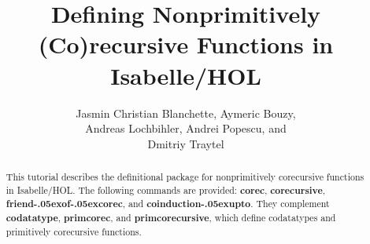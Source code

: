 \documentclass[12pt,a4paper]{article} %
\title{%
Defining Nonprimitively (Co)recursive Functions in Isabelle/HOL}
\author{Jasmin Christian Blanchette, Aymeric Bouzy, \\
Andreas Lochbihler, Andrei Popescu, and \\
Dmitriy Traytel}
\renewcommand\_{\hbox{\textunderscore\kern-.05ex}}
\newcommand{\keyw}[1]{\textbf{#1}}
\begin{document}
\maketitle

\begin{sloppy}
\begin{abstract}
\noindent
This tutorial describes the definitional package for nonprimitively corecursive functions
in Isabelle/HOL. The following commands are provided:
\keyw{corec}, \keyw{corecursive}, \keyw{friend\_of\_corec}, and \keyw{coinduction\_upto}.
They complement \keyw{codatatype}, \keyw{primcorec}, and \keyw{primcorecursive}, which
define codatatypes and primitively corecursive functions.
\end{abstract}
\end{sloppy}

\tableofcontents



\let\em=\sl
{}

\end{document}
